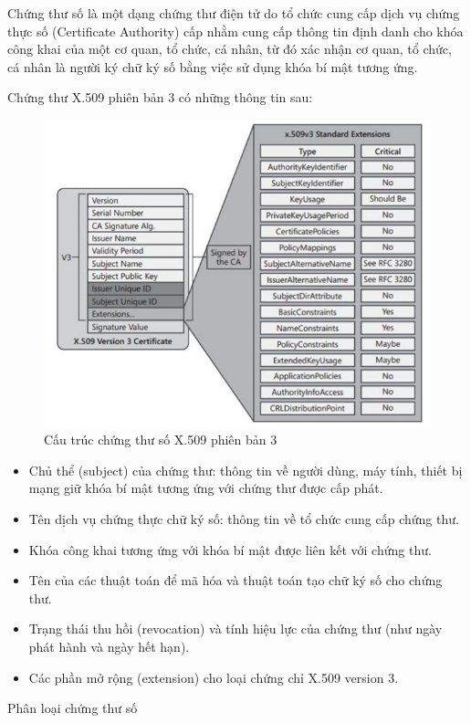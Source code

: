 Chứng thư số là một dạng chứng thư điện tử do tổ chức cung cấp dịch vụ chứng thực số (Certificate Authority) cấp nhằm cung cấp thông tin định danh cho khóa công khai của một cơ quan, tổ chức, cá nhân, từ đó xác nhận cơ quan, tổ chức, cá nhân là người ký chữ ký số bằng việc sử dụng khóa bí mật tương ứng. 

Chứng thư X.509 phiên bản 3 có những thông tin sau:
\begin{figure}[H]
\centering
\includegraphics[width=.9\linewidth]{img/x509v3.jpg}
\caption{Cấu trúc chứng thư số X.509 phiên bản 3}
\end{figure}
\begin{itemize}

\item Chủ thể (subject) của chứng thư: thông tin về người dùng, máy tính, thiết bị mạng giữ khóa bí mật tương ứng với chứng thư được cấp phát.
\item Tên dịch vụ chứng thực chữ ký số: thông tin về tổ chức cung cấp chứng thư.
\item Khóa công khai tương ứng với khóa bí mật được liên kết với chứng thư.
\item Tên của các thuật toán để mã hóa và thuật toán tạo chữ ký số cho chứng thư.
\item Trạng thái thu hồi (revocation) và tính hiệu lực của chứng thư (như ngày phát hành và ngày hết hạn).
\item Các phần mở rộng (extension) cho loại chứng chỉ X.509 version 3.

\end{itemize}

Phân loại chứng thư số

